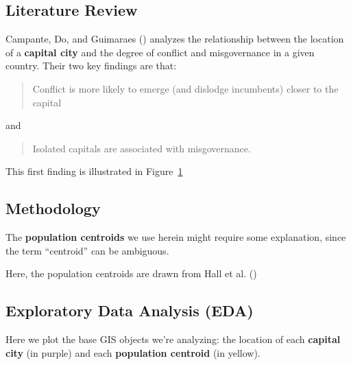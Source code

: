 \documentclass[
  letterpaper,
  DIV=11,
  numbers=noendperiod]{scrartcl}
\begin{document}
\subsection{Literature Review}\label{literature-review}

Campante, Do, and Guimaraes ()
analyzes the relationship between the location of a \textbf{capital
city} and the degree of conflict and misgovernance in a given country.
Their two key findings are that:

\begin{quote}
Conflict is more likely to emerge (and dislodge incumbents) closer to
the capital
\end{quote}

and

\begin{quote}
Isolated capitals are associated with misgovernance.
\end{quote}

This first finding is illustrated in Figure~\ref{fig-conflict-dist}

\begin{figure}


\caption{\label{fig-conflict-dist}}

\end{figure}%

\subsection{Methodology}\label{methodology}

The \textbf{population centroids} we use herein might require some
explanation, since the term ``centroid'' can be ambiguous.

Here, the population centroids are drawn from Hall et al.
()

\subsection{Exploratory Data Analysis
(EDA)}\label{exploratory-data-analysis-eda}

Here we plot the base GIS objects we're analyzing: the location of each
\textbf{capital city} (in purple) and each \textbf{population centroid}
(in yellow).
\end{document}
